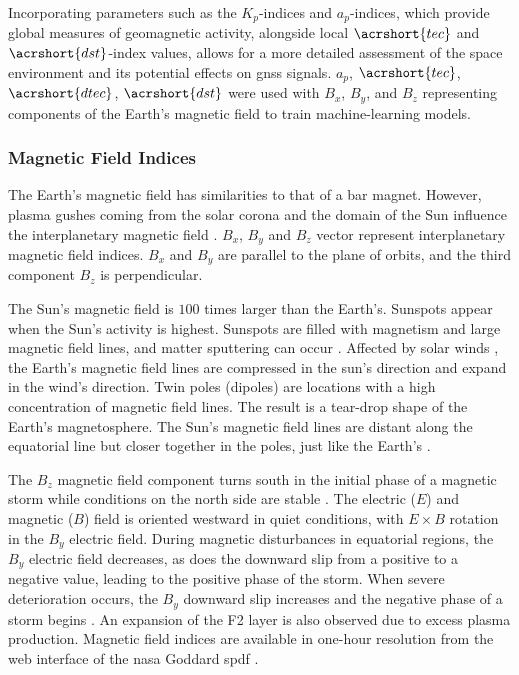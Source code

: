\documentclass[sn-mathphys-num]{sn-jnl}%
\begin{document}
Incorporating parameters such as the $K_{p}$-indices and $a_{p}$-indices, which provide global measures of geomagnetic activity, alongside local $\acrshort{tec}$ and $\acrshort{dst}$-index values, allows for a more detailed assessment of the space environment and its potential effects on \acrshort{gnss} signals. $a_{p}$, $\acrshort{tec}$, $\acrshort{dtec}$, $\acrshort{dst}$ were used with $B_x$, $B_y$, and $B_z$ representing components of the Earth's magnetic field to train machine-learning models.

\subsubsection{Magnetic Field Indices}

The Earth's magnetic field has similarities to that of a bar magnet. However, plasma gushes \cite{schwenn2001solar} coming from the solar corona and the domain of the Sun influence the interplanetary magnetic field \cite{melnikov1990relationships}. $B_{x}$, $B_{y}$ and $B_{z}$ vector represent interplanetary magnetic field indices. $B_{x}$ and $B_{y}$ are parallel to the plane of orbits, and the third component $B_{z}$ is perpendicular. 

The Sun's magnetic field is $100$ times larger than the Earth's. Sunspots \cite{harden2005solar} appear when the Sun's activity is highest. Sunspots are filled with magnetism and large magnetic field lines, and matter sputtering can occur \cite{gonzalez1994geomagnetic}. Affected by solar winds \cite{Viereck2024}, the Earth's magnetic field lines are compressed in the sun's direction and expand in the wind's direction. Twin poles (dipoles) are locations with a high concentration of magnetic field lines. The result is a tear-drop shape of the Earth's magnetosphere. The Sun's magnetic field lines are distant along the equatorial line but closer together in the poles, just like the Earth's \cite{aschwanden2006physics}.

The $B_{z}$ magnetic field component turns south in the initial phase of a magnetic storm while conditions on the north side are stable \cite{abraha2014total}. The electric ($E$) and magnetic ($B$) field is oriented westward in quiet conditions, with $E \times B$ rotation in the $B_{y}$ electric field. During magnetic disturbances in equatorial regions, the $B_{y}$ electric field decreases, as does the downward slip from a positive to a negative value, leading to the positive phase of the storm. When severe deterioration occurs, the $B_{y}$ downward slip increases and the negative phase of a storm begins \cite{turunen1980examples, adeniyi1986magnetic}. An expansion of the F2 layer is also observed due to excess plasma production. Magnetic field indices are available in one-hour resolution from the web interface of the \acrfull{nasa} Goddard \acrfull{spdf} \cite{Papitashvili2024About, Papitashvili2024Explorer}.
 
\end{document}
